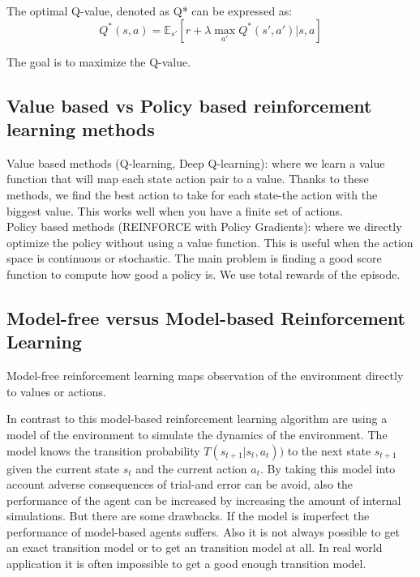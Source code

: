 The optimal Q-value, denoted as Q* can be expressed as:
\begin{equation}
Q^* (s, a) = \mathbb{E}_{s'} [r + \lambda \max_{a'} Q^*(s', a') | s, a]
\end{equation}

The goal is to maximize the Q-value.

\subsection{Value based vs Policy based reinforcement learning methods}

Value based methods (Q-learning, Deep Q-learning): where we learn a value function that will map each state action pair to a value. Thanks to these methods, we find the best action to take for each state-the action with the biggest value. This works well when you have a finite set of actions.\\

Policy based methods (REINFORCE with Policy Gradients): where we directly optimize the policy without using a value function. This is useful when the action space is continuous or stochastic. The main problem is finding a good score function to compute how good a policy is. We use total rewards of the episode.

\subsection{Model-free versus Model-based Reinforcement Learning}

Model-free reinforcement learning maps observation of the environment directly to values or actions.

In contrast to this model-based reinforcement learning algorithm are using a model of the environment to simulate the dynamics of the environment. The model knows the transition probability $T(s_{t+1} | s_t, a_t))$ to the next state $s_{t+1}$ given the current state $s_t$ and the current action $a_t$. By taking this model into account adverse consequences of trial-and error can be avoid, also the performance of the agent can be increased by increasing the amount of internal simulations.
But there are some drawbacks. If the model is imperfect the performance of model-based agents suffers. Also it is not always possible to get an exact transition model or to get an transition model at all. In real world application it is often impossible to get a good enough transition model.\\




